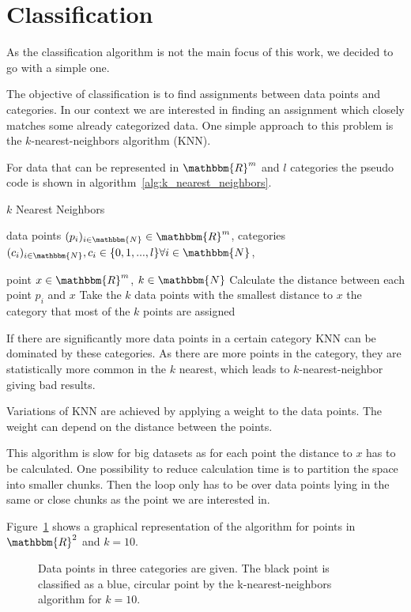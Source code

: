 \newpage

\section{Classification}
\label{sec:classification}

As the classification algorithm is not the main focus of this work, we decided to go with a simple one.

The objective of classification is to find assignments between data points and categories. In our context we are interested in finding an assignment which closely matches some already categorized data. One simple approach to this problem is the $k$-nearest-neighbors algorithm (KNN).

For data that can be represented in $\mathbbm{R}^m$ and $l$ categories the pseudo code is shown in algorithm~\ref{alg:k_nearest_neighbors}.

\begin{algorithm}
	\caption{$k$ Nearest Neighbors}\label{alg:k_nearest_neighbors}
	\begin{algorithmic}
		\Require data points $(p_i)_{i \in \mathbbm{N}} \in \mathbbm{R}^{m}$, categories $(c_i)_{i \in \mathbbm{N}}, c_i \in \{0, 1, ..., l\} \forall i \in \mathbbm{N}$,
		
		point $x \in \mathbbm{R}^{m}$, $k \in \mathbbm{N}$
		\State Calculate the distance between each point $p_i$ and $x$
		\State Take the $k$ data points with the smallest distance to $x$
		\State \Return the category that most of the $k$ points are assigned
	\end{algorithmic}
\end{algorithm}

If there are significantly more data points in a certain category KNN can be dominated by these categories. As there are more points in the category, they are statistically more common in the $k$ nearest, which leads to $k$-nearest-neighbor giving bad results.

Variations of KNN are achieved by applying a weight to the data points. The weight can depend on the distance between the points.

This algorithm is slow for big datasets as for each point the distance to $x$ has to be calculated. One possibility to reduce calculation time is to partition the space into smaller chunks. Then the loop only has to be over data points lying in the same or close chunks as the point we are interested in.

Figure~\ref{fig:k_nearest_neighbors} shows a graphical representation of the algorithm for points in $\mathbbm{R}^2$ and ${k=10}$.

\begin{figure}
	\centering
	
	\caption{Data points in three categories are given. The black point is classified as a blue, circular point by the k-nearest-neighbors algorithm for $k=10$.}
	\label{fig:k_nearest_neighbors}
\end{figure}